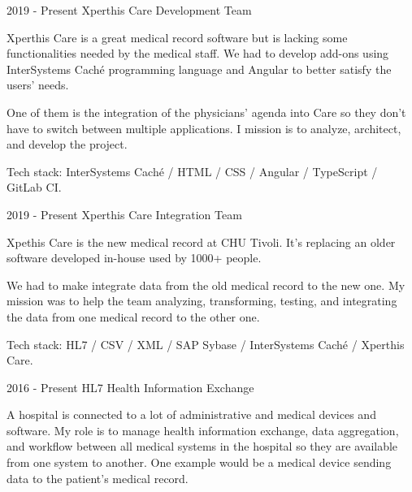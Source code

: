 

\begin{cventries}
    
  \cventry
    {2019 - Present} %
    {Xperthis Care Development Team} %
    {} %
    {} %
    {
Xperthis Care is a great medical record software but is lacking some functionalities needed by the medical staff. We had to develop add-ons using InterSystems Caché programming language and Angular to better satisfy the users' needs.

One of them is the integration of the physicians' agenda into Care so they don't have to switch between multiple applications. I mission is to analyze, architect, and develop the project.

Tech stack: InterSystems Caché / HTML / CSS / Angular / TypeScript / GitLab CI.

    }
    
    
  \cventry
    {2019 - Present} %
    {Xperthis Care Integration Team} %
    {} %
    {} %
    {
Xpethis Care is the new medical record at CHU Tivoli. It's replacing an older software developed in-house used by 1000+ people.

We had to make integrate data from the old medical record to the new one. My mission was to help the team analyzing, transforming, testing, and integrating the data from one medical record to the other one.

Tech stack: HL7 / CSV / XML / SAP Sybase / InterSystems Caché / Xperthis Care.

    }
    
  \cventry
    {2016 - Present} %
    {HL7 Health Information Exchange} %
    {} %
    {} %
    {
A hospital is connected to a lot of administrative and medical devices and software. 
My role is to manage health information exchange, data aggregation, and workflow between all medical systems in the hospital so they are available from one system to another. One example would be a medical device sending data to the patient's medical record. 

}
\end{cventries}
